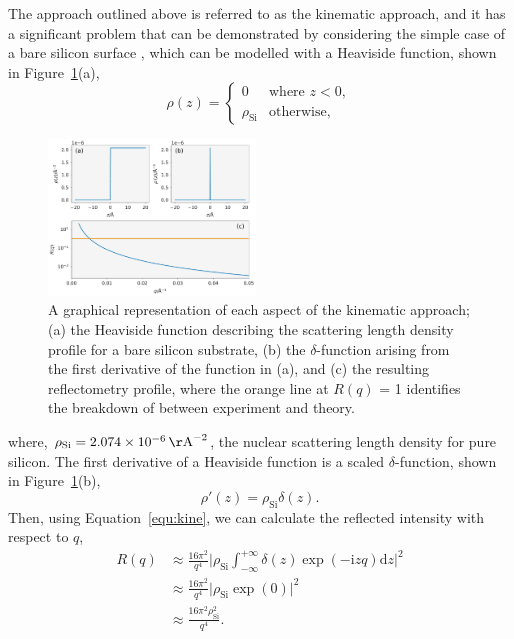 \documentclass[
 reprint,
 superscriptaddress,
 amsmath,amssymb,
 aps,
]{revtex4-1}
\newcommand{\angstrom}{\rm{\AA}}
\begin{document}
The approach outlined above is referred to as the kinematic approach, and it has a significant problem that can be demonstrated by considering the simple case of a bare silicon surface \cite{sivia_elementary_2011}, which can be modelled with a Heaviside function, shown in Figure~\ref{fig:kine}(a),
%
\begin{equation}
    \rho(z) =
    \begin{cases}
        0 & \text{where } z < 0,\\
        \rho_{\text{Si}} & \text{otherwise},
    \end{cases}
\end{equation}
%
%
\begin{figure}[t]
    \includegraphics[width=0.49\textwidth]{kine}
    \caption{A graphical representation of each aspect of the kinematic approach; (a) the Heaviside function describing the scattering length density profile for a bare silicon substrate, (b) the $\delta$-function arising from the first derivative of the function in (a), and (c) the resulting reflectometry profile, where the orange line at $R(q)$ = 1 identifies the breakdown of between experiment and theory.}
    \label{fig:kine}
\end{figure}
%
where, $\rho_{\text{Si}} = \SI{2.074e-6}{\angstrom^{-2}}$, the nuclear scattering length density for pure silicon.
The first derivative of a Heaviside function is a scaled $\delta$-function, shown in Figure~\ref{fig:kine}(b),
%
\begin{equation}
    \rho'(z) = \rho_{\text{Si}}\delta(z).
\end{equation}
%
Then, using Equation~\ref{equ:kine}, we can calculate the reflected intensity with respect to $q$,
%
\begin{equation}
    \begin{aligned}
    R(q) & \approx \frac{16\pi^2}{q^4} \bigg| \rho_{\text{Si}}\int^{+\infty}_{-\infty}{\delta(z)\exp{(-\mathrm{i} zq) \text{d}z}} \bigg|^2 \\
     & \approx \frac{16\pi^2}{q^4} \bigg| \rho_{\text{Si}} \exp{(0)} \bigg| ^2 \\
     & \approx \frac{16\pi^2\rho_{\text{Si}}^2}{q^4}.
    \end{aligned}
    \label{equ:baresi}
\end{equation}
\end{document}
